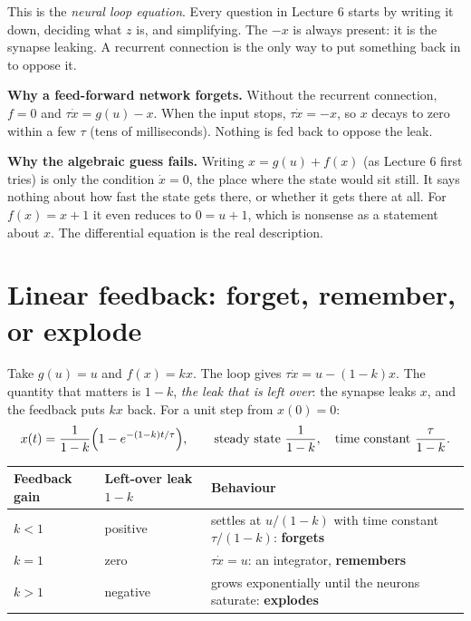 \documentclass[11pt,letterpaper]{article}
\begin{document}
\begin{key}
This is the \emph{neural loop equation}. Every question in Lecture 6 starts by writing it down, deciding what $z$ is, and simplifying. The $-x$ is always present: it is the synapse leaking. A recurrent connection is the only way to put something back in to oppose it.
\end{key}

\textbf{Why a feed-forward network forgets.} Without the recurrent connection, $f = 0$ and $\tau\dot x = g(u) - x$. When the input stops, $\tau\dot x = -x$, so $x$ decays to zero within a few $\tau$ (tens of milliseconds). Nothing is fed back to oppose the leak.

\textbf{Why the algebraic guess fails.} Writing $x = g(u) + f(x)$ (as Lecture 6 first tries) is only the condition $\dot x = 0$, the place where the state would sit still. It says nothing about how fast the state gets there, or whether it gets there at all. For $f(x) = x + 1$ it even reduces to $0 = u + 1$, which is nonsense as a statement about $x$. The differential equation is the real description.

\section{Linear feedback: forget, remember, or explode}

Take $g(u) = u$ and $f(x) = kx$. The loop gives $\tau\dot x = u - (1 - k)x$. The quantity that matters is $1 - k$, \emph{the leak that is left over}: the synapse leaks $x$, and the feedback puts $kx$ back. For a unit step from $x(0) = 0$:
\[
x(t) = \frac{1}{1 - k}\Bigl(1 - e^{-(1-k)t/\tau}\Bigr), \qquad \text{steady state } \frac{1}{1-k}, \quad \text{time constant } \frac{\tau}{1-k}.
\]

\begin{center}
\begin{tabular}{@{}lll@{}}
\toprule
Feedback gain & Left-over leak $1 - k$ & Behaviour \\
\midrule
$k < 1$ & positive & settles at $u/(1-k)$ with time constant $\tau/(1-k)$: \textbf{forgets} \\
$k = 1$ & zero & $\tau\dot x = u$: an integrator, \textbf{remembers} \\
$k > 1$ & negative & grows exponentially until the neurons saturate: \textbf{explodes} \\
\bottomrule
\end{tabular}
\end{center}
\end{document}
